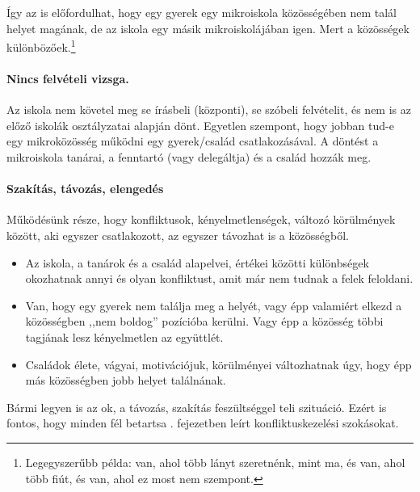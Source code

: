 Így az is előfordulhat, hogy egy gyerek egy mikroiskola közösségében nem talál
helyet magának, de az iskola egy másik mikroiskolájában igen. Mert a
közösségek különbözőek.\footnote{Legegyszerűbb példa: van, ahol több lányt
      szeretnénk, mint ma, és van, ahol több fiút, és van, ahol ez most nem
      szempont.}

\paragraph{Nincs felvételi vizsga.}
Az iskola nem követel meg se írásbeli (központi), se szóbeli
felvételit, és nem is az előző iskolák osztályzatai alapján dönt. Egyetlen
szempont, hogy jobban tud-e egy mikroközösség működni egy gyerek/család
csatlakozásával. A döntést a mikroiskola tanárai, a fenntartó (vagy
delegáltja) és a család hozzák meg.


\paragraph{Szakítás, távozás, elengedés}
Működésünk része, hogy konfliktusok, kényelmetlenségek, változó körülmények
között, aki egyszer csatlakozott, az egyszer távozhat is a közösségből.
\begin{itemize}
      \item Az iskola, a tanárok és a család alapelvei, értékei közötti
            különbségek okozhatnak annyi és olyan konfliktust, amit már nem
            tudnak a felek
            feloldani.
      \item Van, hogy egy gyerek nem találja meg a helyét, vagy épp valamiért
            elkezd a közösségben ,,nem boldog'' pozícióba kerülni. Vagy épp a
            közösség
            többi tagjának lesz kényelmetlen az együttlét.
      \item Családok élete, vágyai, motivációjuk, körülményei
        változhatnak\linebreak
        úgy,
            hogy épp más közösségben jobb helyet találnának.
\end{itemize}

Bármi legyen is az ok, a távozás, szakítás feszültséggel teli szituáció. Ezért
is fontos, hogy minden fél betartsa  .
fejezetben leírt konfliktuskezelési szokásokat.
